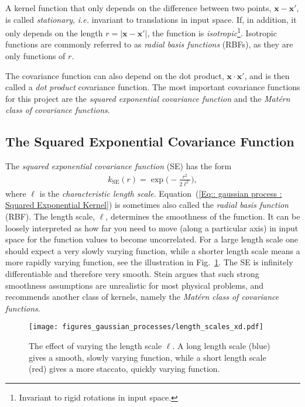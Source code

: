 \documentclass[twoside,english]{uiofysmaster}
\begin{document}
{A kernel function that only depends on the difference between two points, $\textbf{x}-\textbf{x}'$, is called \textit{stationary}, \textit{i.e.} invariant to translations in input space. If, in addition, it only depends on the length $r=|\textbf{x}-\textbf{x}'|$, the function is \textit{isotropic}\footnote{Invariant to rigid rotations in input space.}.  Isotropic functions are commonly referred to as \textit{radial basis functions} (RBFs), as they are only functions of $r$. 

The covariance function can also depend on the dot product, $\textbf{x} \cdot \textbf{x}'$, and is then called a \textit{dot product} covariance function. The most important covariance functions for this project are the \textit{squared exponential covariance function} and the \textit{Mat\'{e}rn class of covariance functions}.




\subsection{The Squared Exponential Covariance Function}

The \textit{squared exponential covariance function} (SE) has the form 
\begin{align}\label{Eq:: gaussian process : Squared Exponential Kernel}
k_{\mathrm{SE}} (r) = \exp \Big( - \frac{r^2}{2 \ell^2} \Big),
\end{align} 
where $\ell$ is the \textit{characteristic length scale}. Equation~(\ref{Eq:: gaussian process : Squared Exponential Kernel}) is sometimes also called the \textit{radial basis function} (RBF). The length scale, $\ell$, determines the smoothness of the function. It can be loosely interpreted as how far you need to move (along a particular axis) in input space for the function values to become uncorrelated. For a large length scale one should expect a very slowly varying function, while a shorter length scale means a more rapidly varying function, see the illustration in Fig.~\ref{Fig:: gaussian process : ell variation example}. The SE is infinitely differentiable and therefore very smooth. Stein \cite{steininterpolation} argues that such strong smoothness assumptions are unrealistic for most physical problems, and recommends another class of kernels, namely the \textit{Mat\'{e}rn class of covariance functions}.

\begin{figure}
\centering
\texttt{[image: figures\_gaussian\_processes/length\_scales\_xd.pdf]}
\caption{The effect of varying the length scale $\ell$. A long length scale (blue) gives a smooth, slowly varying function, while a short length scale (red) gives a more staccato, quickly varying function.}
\label{Fig:: gaussian process : ell variation example}
\end{figure}

}
\end{document}
